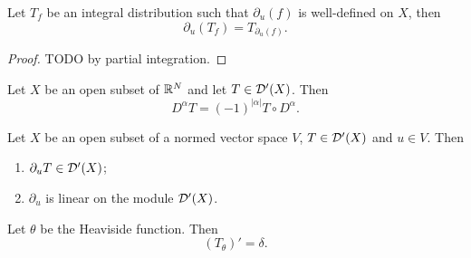 \begin{lemma}
Let $T_f$ be an integral distribution such that $\partial_u(f)$ is well-defined on $X$, then
\[ \partial_u(T_f) = T_{\partial_{u}(f)}. \]
\end{lemma}
\begin{proof}
TODO by partial integration.
\end{proof}

\begin{lemma}
Let $X$ be an open subset of $\mathbb{R}^N$ and let $T\in \operatorname{\mathcal{D}^\prime}(X)$. Then
\[ D^\alpha T = (-1)^{|\alpha|}T\circ D^\alpha. \]
\end{lemma}

\begin{proposition}
    Let $X$ be an open subset of a normed vector space $V$, $T\in \operatorname{\mathcal{D}^\prime}(X)$ and $u\in V$. Then
    \begin{enumerate}
    \item $\partial_{u}T \in \operatorname{\mathcal{D}^\prime}(X)$;
    \item $\partial_{u}$ is linear on the module $\operatorname{\mathcal{D}^\prime}(X)$.
    \end{enumerate}
\end{proposition}

\begin{proposition}
Let $\theta$ be the Heaviside function. Then
\[ (T_\theta)' = \delta. \]
\end{proposition}

